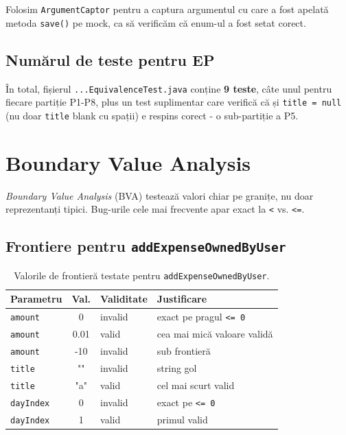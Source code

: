 Folosim \texttt{ArgumentCaptor} pentru a captura argumentul cu care a fost apelată metoda \texttt{save()} pe mock, ca să verificăm că enum-ul a fost setat corect.

\subsection{Numărul de teste pentru EP}

În total, fișierul \texttt{...EquivalenceTest.java} conține \textbf{9 teste}, câte unul pentru fiecare partiție P1-P8, plus un test suplimentar care verifică că și \texttt{title = null} (nu doar \texttt{title} blank cu spații) e respins corect - o sub-partiție a P5.

\section{Boundary Value Analysis}
\label{sec:bva}

\textit{Boundary Value Analysis} (BVA) testează valori chiar pe granițe, nu doar reprezentanți tipici. Bug-urile cele mai frecvente apar exact la \texttt{<} vs. \texttt{<=}.

\subsection{Frontiere pentru \texttt{addExpenseOwnedByUser}}

\begin{table}[!htb]
\centering
\caption{Valorile de frontieră testate pentru \texttt{addExpenseOwnedByUser}.}
\label{tab:bva-input}
\begin{tabularx}{\linewidth}{lcXX}
\toprule
\textbf{Parametru} & \textbf{Val.} & \textbf{Validitate} & \textbf{Justificare} \\
\midrule
\texttt{amount} & 0 & invalid & exact pe pragul \texttt{<= 0} \\
\texttt{amount} & 0.01 & valid & cea mai mică valoare validă \\
\texttt{amount} & -10 & invalid & sub frontieră \\
\texttt{title} & "" & invalid & string gol \\
\texttt{title} & "a" & valid & cel mai scurt valid \\
\texttt{dayIndex} & 0 & invalid & exact pe \texttt{<= 0} \\
\texttt{dayIndex} & 1 & valid & primul valid \\
\bottomrule
\end{tabularx}
\end{table}

